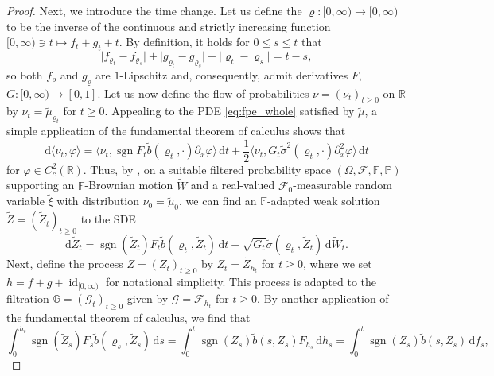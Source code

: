 \documentclass[11pt, a4paper]{article}
\theoremstyle{plain}
\theoremstyle{definition}
\theoremstyle{remark}
\numberwithin{equation}{section}
\DeclareMathOperator{\id}{id}
\DeclareMathOperator{\sgn}{sgn}
\newcommand{\pr}{\mathbb{P}}
\newcommand{\R}{\mathbb{R}}
\newcommand{\F}{\mathcal{F}}
\renewcommand{\d}{\mathrm{d}}
\newcommand{\define}{\mathpunct{:}}
\newcommand{\bb}[1]{\mathbb{#1}}
\renewcommand{\cal}[1]{\mathcal{#1}}
\begin{document}
\begin{proof}
Next, we introduce the time change. Let us define the $\varrho \define [0, \infty) \to [0, \infty)$ to be the inverse of the continuous and strictly increasing function $[0, \infty) \ni t \mapsto f_t + g_t + t$. By definition, it holds for $0 \leq s \leq t$ that
\begin{equation*}
    \bigl\lvert f_{\varrho_t} - f_{\varrho_s} \bigr\rvert + \bigl\lvert g_{\varrho_t} - g_{\varrho_s} \bigr\rvert + \lvert \varrho_t - \varrho_s \rvert = t - s,
\end{equation*}
so both $f_{\varrho}$ and $g_{\varrho}$ are $1$-Lipschitz and, consequently, admit derivatives $F$, $G \define [0, \infty) \to [0, 1]$. Let us now define the flow of probabilities $\nu = (\nu_t)_{t \geq 0}$ on $\R$ by $\nu_t = \tilde{\mu}_{\varrho_t}$ for $t \geq 0$. Appealing to the PDE \eqref{eq:fpe_whole} satisfied by $\tilde{\mu}$, a simple application of the fundamental theorem of calculus shows that
\begin{equation*}
    \d \langle \nu_t, \varphi\rangle = \bigl\langle \nu_t, \sgn F_t \tilde{b}(\varrho_t, \cdot) \partial_x \varphi\bigr\rangle \, \d t + \frac{1}{2} \bigl\langle \nu_t, G_t \tilde{\sigma}^2(\varrho_t, \cdot) \partial_x^2 \varphi\bigr\rangle \, \d t
\end{equation*}
for $\varphi \in C_c^2(\R)$. Thus, by \cite[Theorem 2.6]{figalli_superposition_2008}, on a suitable filtered probability space $(\Omega, \F, \bb{F}, \pr)$ supporting an $\bb{F}$-Brownian motion $\tilde{W}$ and a real-valued $\F_0$-measurable random variable $\tilde{\xi}$ with distribution $\nu_0 = \tilde{\mu}_0$, we can find an $\bb{F}$-adapted weak solution $\tilde{Z} = (\tilde{Z}_t)_{t \geq 0}$ to the SDE
\begin{equation*}
    \d \tilde{Z}_t = \sgn(\tilde{Z}_t) F_t \tilde{b}(\varrho_t, \tilde{Z}_t) \, \d t + \sqrt{G_t} \tilde{\sigma}(\varrho_t, \tilde{Z}_t) \, \d \tilde{W}_t.
\end{equation*}
Next, define the process $Z = (Z_t)_{t \geq 0}$ by $Z_t = \tilde{Z}_{h_t}$ for $t \geq 0$, where we set $h = f + g + \id_{[0, \infty)}$ for notational simplicity. This process is adapted to the filtration $\bb{G} = (\cal{G}_t)_{t \geq 0}$ given by $\cal{G} = \F_{h_t}$ for $t \geq 0$. By another application of the fundamental theorem of calculus, we find that
\begin{equation} \label{eq:calc_f_int}
    \int_0^{h_t} \sgn(\tilde{Z}_s) F_s \tilde{b}(\varrho_s, \tilde{Z}_s) \, \d s = \int_0^t \sgn(Z_s) \tilde{b}(s, Z_s) F_{h_s} \, \d h_s = \int_0^t \sgn(Z_s) \tilde{b}(s, Z_s) \, \d f_s,

\end{equation}
\end{proof}
\end{document}
